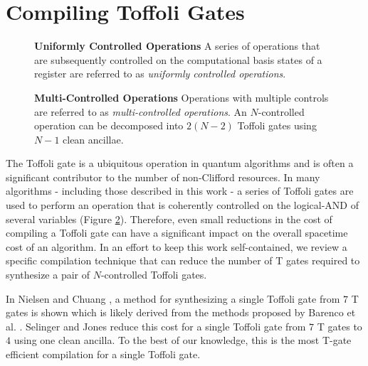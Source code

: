 \section{Compiling Toffoli Gates}
\label{sec:elbows}


\begin{figure}
    
    \caption{
        \textbf{Uniformly Controlled Operations}
        A series of operations that are subsequently controlled on the computational basis states of a register are referred to as \textit{uniformly controlled operations}.
    }
    \label{fig:uniformly-controlled-ops}
\end{figure}


\begin{figure}
    
    \caption{
        \textbf{Multi-Controlled Operations}
        Operations with multiple controls are referred to as \textit{multi-controlled operations}.
        An $N$-controlled operation can be decomposed into $2(N-2)$ Toffoli gates using $N-1$ clean ancillae.
    }
    \label{fig:multi-controlled-op}
\end{figure}


The Toffoli gate is a ubiquitous operation in quantum algorithms and is often a significant contributor to the number of non-Clifford resources.
In many algorithms - including those described in this work - a series of Toffoli gates are used to perform an operation that is coherently controlled on the logical-AND of several variables (Figure \ref{fig:multi-controlled-op}).
Therefore, even small reductions in the cost of compiling a Toffoli gate can have a significant impact on the overall spacetime cost of an algorithm.
In an effort to keep this work self-contained, we review a specific compilation technique that can reduce the number of T gates required to synthesize a pair of $N$-controlled Toffoli gates. 

In Nielsen and Chuang \cite{nielsen2001quantum}, a method for synthesizing a single Toffoli gate from $7$ T gates is shown which is likely derived from the methods proposed by Barenco et al. \cite{barenco1995elementary}.
Selinger \cite{selinger2013quantum} and Jones \cite{jones2013low} reduce this cost for a single Toffoli gate from $7$ T gates to $4$ using one clean ancilla.
To the best of our knowledge, this is the most T-gate efficient compilation for a single Toffoli gate.


